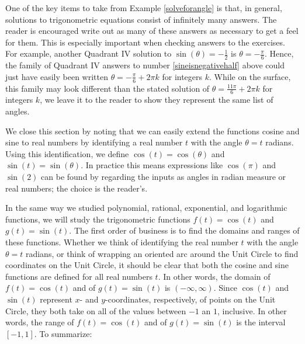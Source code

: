 One of the key items to take from Example \ref{solveforangle} is that, in general, solutions to trigonometric equations consist of infinitely many answers.  The reader is encouraged write out as many of these answers as necessary to get a feel for them.   This is especially important when checking answers to the exercises.   For example, another Quadrant IV solution to $\sin(\theta) = -\frac{1}{2}$ is $\theta = -\frac{\pi}{6}$.  Hence, the family of Quadrant IV answers to number \ref{sineisnegativehalf} above could just have easily been written $\theta = -\frac{\pi}{6} + 2\pi k$ for integers $k$.  While on the surface, this family may look different than the stated solution of $\theta = \frac{11\pi}{6} + 2\pi k$ for integers $k$, we leave it to the reader to show they represent the same list of angles.



\medskip

We close this section by noting that we can easily extend the functions cosine and sine to real numbers by identifying a real number $t$ with the angle $\theta = t$ radians.  Using this identification, we define $\cos(t) = \cos(\theta)$ and $\sin(t) = \sin(\theta)$. In practice this means expressions like $\cos(\pi)$ and $\sin(2)$ can be found by regarding the inputs as angles in radian measure or real numbers;  the choice is the reader's.  


In the same way we studied polynomial, rational, exponential, and logarithmic functions, we will study the trigonometric functions $f(t) = \cos(t)$ and $g(t) = \sin(t)$.  The first order of business is to find the domains and ranges of these functions.  Whether we think of identifying the real number $t$ with the angle $\theta = t$ radians, or think of wrapping an oriented arc around the Unit Circle to find coordinates on the Unit Circle, it should be clear that both the cosine and sine functions are defined for all real numbers $t$.  In other words, the domain  of $f(t) = \cos(t)$ and of $g(t) = \sin(t)$ is $(-\infty, \infty)$.  Since $\cos(t)$ and $\sin(t)$ represent $x$- and $y$-coordinates, respectively, of points on the Unit Circle, they both take on all of the values between $-1$ an $1$, inclusive.  In other words, the range of $f(t) = \cos(t)$ and of $g(t) = \sin(t)$ is the interval $[-1,1]$.  To summarize:


